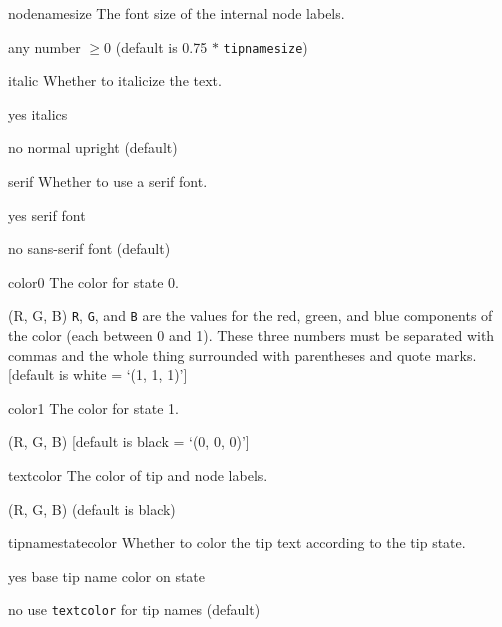 \documentclass[10pt]{article}
\begin{document}
\begin{optdescrip}
	\item[nodenamesize] The font size of the internal node labels.
		\begin{valdescrip}
			\item[]  any number $\ge 0$ (default is 0.75 $*$ \texttt{tipnamesize})
		\end{valdescrip}

	\item[italic] Whether to italicize the text.
		\begin{valdescrip}
			\item[yes] italics
			\item[no] normal upright (default)
		\end{valdescrip}

	\item[serif] Whether to use a serif font.
		\begin{valdescrip}
			\item[yes] serif font
			\item[no] sans-serif font (default)
		\end{valdescrip}

	\item[color0] The color for state 0.
		\begin{valdescrip}
		\item[(R, G, B)] \texttt{R}, \texttt{G}, and \texttt{B} are the values for the red, green, and blue components of the color (each between 0 and 1).  These three numbers must be separated with commas and the whole thing surrounded with parentheses and quote marks.  [default is white = `(1, 1, 1)']
		\end{valdescrip}

	\item[color1] The color for state 1.
		\begin{valdescrip}
			\item[(R, G, B)] [default is black = `(0, 0, 0)']
		\end{valdescrip}

\pagebreak

	\item[textcolor] The color of tip and node labels.
		\begin{valdescrip}
			\item[(R, G, B)] (default is black)
		\end{valdescrip}

	\item[tipnamestatecolor] Whether to color the tip text according to the tip state.
		\begin{valdescrip}
			\item[yes] base tip name color on state
			\item[no] use \texttt{textcolor} for tip names (default)
		\end{valdescrip}


\end{optdescrip}
\end{document}
